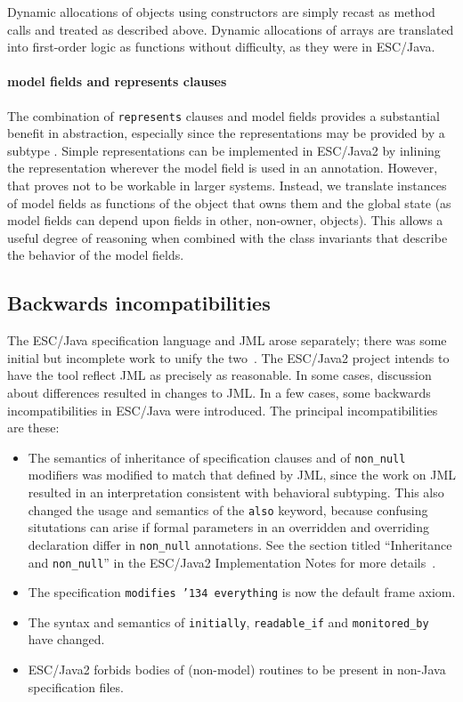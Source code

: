 \documentclass{llncs}
\begin{document}
Dynamic allocations of objects using constructors are simply recast as
method calls and treated as described above.  Dynamic allocations of
arrays are translated into first-order logic as functions without
difficulty, as they were in ESC/Java.

\paragraph*{model fields and represents clauses}
The combination of \texttt{represents} clauses and model fields
provides a substantial benefit in abstraction, especially since the
representations may be provided by a subtype \cite{Cheon-etal03}.
Simple representations can be implemented in ESC/Java2 by inlining the
representation wherever the model field is used in an annotation.
However, that proves not to be workable in larger systems.  Instead,
we translate instances of model fields as functions of the object that
owns them and the global state (as model fields can depend upon fields
in other, non-owner, objects).  This allows a useful degree of
reasoning when combined with the class invariants that describe the
behavior of the model fields.

\subsection{Backwards incompatibilities}
The ESC/Java specification language and JML arose separately; there
was some initial but incomplete work to unify the
two~\cite{Leavens-etal03}.  The ESC/Java2 project intends to have the
tool reflect JML as precisely as reasonable.  In some cases,
discussion about differences resulted in changes to JML.  In a few
cases, some backwards incompatibilities in ESC/Java were introduced.
The principal incompatibilities are these:
\setlength{\partopsep}{0in}\setlength{\parskip}{0in}\setlength{\itemsep}{0in}\setlength{\topsep}{0in}
\begin{itemize}
\setlength{\partopsep}{0in}\setlength{\parskip}{0in}\setlength{\itemsep}{0in}\setlength{\topsep}{0in}
\item The semantics of inheritance of specification clauses and of
  \texttt{non\_null} modifiers was modified to match that defined by
  JML, since the work on JML resulted in an interpretation consistent
  with behavioral subtyping.  This also changed the usage and
  semantics of the \texttt{also} keyword, because confusing
  situtations can arise if formal parameters in an overridden and
  overriding declaration differ in \texttt{non\_null} annotations.  See
  the section titled ``Inheritance and \texttt{non\_null}'' in the
  ESC/Java2 Implementation Notes for more
  details~\cite{Cok04-Impl-Notes}.
\item The specification \texttt{modifies \char'134 everything} is now
  the default frame axiom.
\item The syntax and semantics of \texttt{initially},
  \texttt{readable\_if} and \texttt{monitored\_by} have changed.
\item ESC/Java2 forbids bodies of (non-model) routines to be present
  in non-Java specification files.
\end{itemize}
\end{document}
